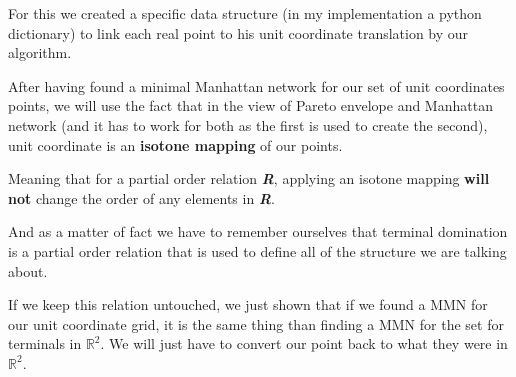 For this we created a specific data structure (in my implementation a python dictionary) to link each real point to his unit coordinate translation by our algorithm.\newline

After having found a minimal Manhattan network for our set of unit coordinates points, we will use the fact that in the view of Pareto envelope and Manhattan network (and it has to work for both as the first is used to create the second), unit coordinate is an \textbf{isotone mapping} of our points.

Meaning that for a partial order relation \emph{\textbf{R}}, applying an isotone mapping \textbf{will not} change the order of any elements in \emph{\textbf{R}}.

And as a matter of fact we have to remember ourselves that terminal domination is a partial order relation that is used to define all of the structure we are talking about.

If we keep this relation untouched, we just shown that if we found a MMN for our unit coordinate grid, it is the same thing than finding a MMN for the set for terminals in $\mathbb{R}^2$. We will just have to convert our point back to what they were in $\mathbb{R}^2$.